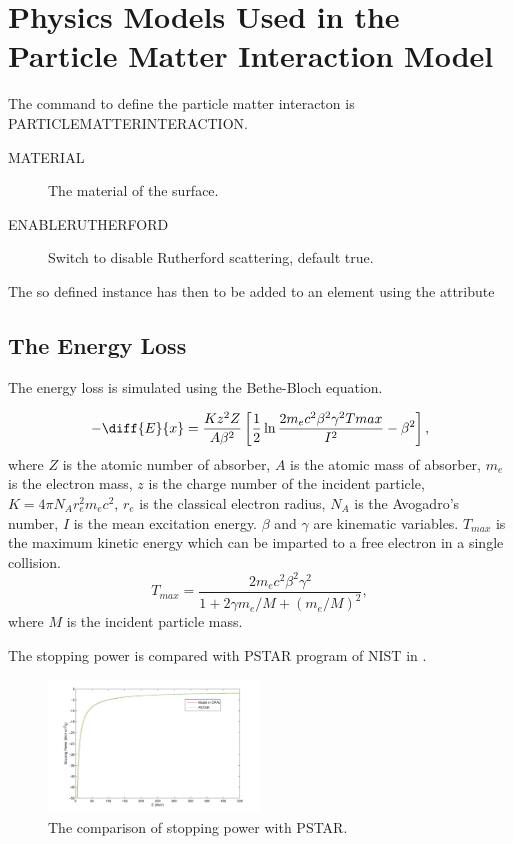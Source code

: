 

\chapter{Physics Models Used in the Particle Matter Interaction Model}
\label{chp:partmatt}

The command to define the particle matter interacton is PARTICLEMATTERINTERACTION.
\begin{description}
\item[MATERIAL]
The material of the surface.
\item[ENABLERUTHERFORD]
Switch to disable Rutherford scattering, default true.
\end{description}
The so defined instance has then to be added to an element using the attribute

\section{The Energy Loss}

The energy loss is simulated using the Bethe-Bloch equation.

\begin{equation}
\label{eq:dEdx}
-\diff{E}{x}=\frac{K z^2 Z}{A \beta^2}\left[\frac{1}{2} \ln{\frac{2 m_e c^2\beta^2 \gamma^2 Tmax}{I^2}}-\beta^2 \right],
\end{equation}
where $Z$ is the atomic number of absorber, $A$ is the atomic mass of absorber, $m_e$ is the electron mass, $z$ is the charge number of the incident particle, $K=4\pi N_Ar_e^2m_ec^2$, $r_e$ is the classical electron radius, $N_A$ is the Avogadro's number, $I$ is the mean excitation energy. $\beta$ and $\gamma$ are kinematic variables. $T_{max}$ is the maximum kinetic energy which can be imparted to a free electron in a single collision.
\begin{equation}
T_{max}=\frac{2m_ec^2\beta^2\gamma^2}{1+2\gamma m_e/M+(m_e/M)^2},
\end{equation}
where $M$ is the incident particle mass.

The stopping power is compared with PSTAR program of NIST in .
\begin{figure}[h!]
\begin{center}
\includegraphics[width=0.5\textwidth]{figures/partmatter/dEdx}
\end{center}
\caption{The comparison of stopping power with PSTAR. }
\label{fig:dEdx}
\end{figure}

